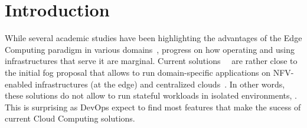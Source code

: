 \section{Introduction}
\label{sec:intro}



While several academic studies have been highlighting the advantages
of the Edge Computing paradigm in various
domains~\cite{bonomi2012fog,satyanarayanan2017emergence,shi2016edge,yi2015fog,zhang2015cloud},
progress on how operating and using infrastructures that serve it are marginal.
Current solutions~\cite{akamai:cloudlets}~\cite{amazon:lambda-edge} are rather close to the
initial fog proposal that allows to run domain-specific applications
on  NFV-enabled infrastructures (at the edge) and
centralized clouds~\cite{bonomi2012fog}.  In other words, %
these solutions do not allow to run stateful
workloads in isolated environments, .
%
This is surprising as DevOps expect to find most features that make the sucess of
current Cloud Computing solutions.




